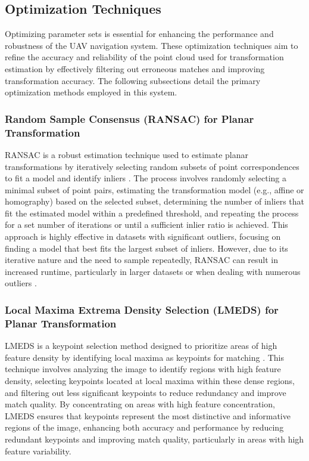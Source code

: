 \subsection{Optimization Techniques}

Optimizing parameter sets is essential for enhancing the performance and robustness of the UAV navigation system. These optimization techniques aim to refine the accuracy and reliability of the point cloud used for transformation estimation by effectively filtering out erroneous matches and improving transformation accuracy. The following subsections detail the primary optimization methods employed in this system.

\subsubsection{Random Sample Consensus (RANSAC) for Planar Transformation}

RANSAC is a robust estimation technique used to estimate planar transformations by iteratively selecting random subsets of point correspondences to fit a model and identify inliers \cite{fisher2002ransac}. The process involves randomly selecting a minimal subset of point pairs, estimating the transformation model (e.g., affine or homography) based on the selected subset, determining the number of inliers that fit the estimated model within a predefined threshold, and repeating the process for a set number of iterations or until a sufficient inlier ratio is achieved. This approach is highly effective in datasets with significant outliers, focusing on finding a model that best fits the largest subset of inliers. However, due to its iterative nature and the need to sample repeatedly, RANSAC can result in increased runtime, particularly in larger datasets or when dealing with numerous outliers \cite{fisher2002ransac}.

\subsubsection{Local Maxima Extrema Density Selection (LMEDS) for Planar Transformation}

LMEDS is a keypoint selection method designed to prioritize areas of high feature density by identifying local maxima as keypoints for matching \cite{farin2005video}. This technique involves analyzing the image to identify regions with high feature density, selecting keypoints located at local maxima within these dense regions, and filtering out less significant keypoints to reduce redundancy and improve match quality. By concentrating on areas with high feature concentration, LMEDS ensures that keypoints represent the most distinctive and informative regions of the image, enhancing both accuracy and performance by reducing redundant keypoints and improving match quality, particularly in areas with high feature variability.


